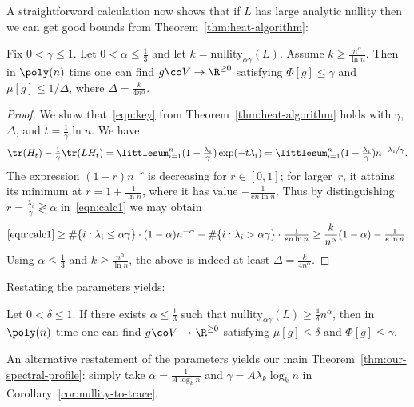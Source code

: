 \documentclass[11pt]{article}
\newcommand{\Bdry}{\Phi}
\newcommand{\Spars}{\mu}
\newcommand{\nullity}{\mathrm{nullity}}
\newcommand{\partsize}{\Delta}
\begin{document}
A straightforward calculation now shows that if $L$ has large analytic nullity then we can get good bounds from Theorem~\ref{thm:heat-algorithm}:
\begin{corollary}                                       \label{cor:nullity-to-trace}
    Fix $0 < \gamma \leq 1$.  Let $0 < \alpha \leq \frac13$ and let $k = \nullity_{\alpha \gamma}(L)$.  Assume $k \geq \frac{n^\alpha}{\ln n}$.  Then in $\poly(n)$ time one can find $g \co V \to \R^{\geq 0}$ satisfying $\Bdry[g] \leq \gamma$ and $\Spars[g] \leq 1/\partsize$, where $\partsize = \frac{k}{4n^{\alpha}}$.
\end{corollary}
\begin{proof}
    We show that~\eqref{eqn:key} from Theorem~\ref{thm:heat-algorithm} holds with $\gamma$, $\partsize$, and $t = \frac{1}{\gamma} \ln n$.  We have
    \begin{equation} \label{eqn:calc1}
        \tr(H_t) - \tfrac{1}{\gamma} \tr(LH_t) = \littlesum_{i=1}^{n} (1 - \tfrac{\lambda_i}{\gamma}) \exp(-t\lambda_i)  = \littlesum_{i=1}^{n} (1-\tfrac{\lambda_i}{\gamma}) n^{-\lambda_i/\gamma}.
    \end{equation}
    The expression $(1-r)n^{-r}$ is decreasing for $r \in [0,1]$; for larger~$r$, it attains its minimum at $r = 1+\frac{1}{\ln n}$, where it has value $-\frac{1}{en \ln n}$.  Thus by distinguishing $r =\frac{\lambda_i}{\gamma} \gtrless \alpha$ in~\eqref{eqn:calc1} we may obtain
    \[
        \eqref{eqn:calc1} \geq \#\{i : \lambda_i \leq \alpha \gamma\} \cdot (1-\alpha)n^{-\alpha} - \#\{i : \lambda_i > \alpha \gamma\} \cdot \tfrac{1}{en\ln n} \geq \frac{k}{n^\alpha}(1-\alpha) - \tfrac{1}{e\ln n}.
    \]
    Using $\alpha \leq \frac13$ and $k \geq \frac{n^\alpha}{\ln n}$, the above is indeed at least $\partsize = \frac{k}{4n^{\alpha}}$.
\end{proof}

Restating the parameters yields:
\begin{corollary} \label{cor:alt-nullity-to-trace}
    Let $0 < \delta \leq 1$. If there exists $\alpha \leq \frac13$ such that $\nullity_{\alpha \gamma}(L) \geq \frac{4}{\delta} n^\alpha$, then in  $\poly(n)$ time one can find $g \co V \to \R^{\geq 0}$ satisfying $\Spars[g] \leq \delta$ and $\Bdry[g] \leq \gamma$.
\end{corollary}

An alternative restatement of the parameters yields our main Theorem~\ref{thm:our-spectral-profile}:  simply take $\alpha = \tfrac{1}{A \log_k n}$ and $\gamma = A \lambda_{k} \log_k n$ in Corollary~\ref{cor:nullity-to-trace}.
\end{document}
